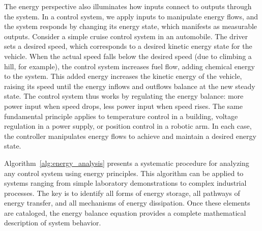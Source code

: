 The energy perspective also illuminates how inputs connect to outputs through the system. In a control system, we apply inputs to manipulate energy flows, and the system responds by changing its energy state, which manifests as measurable outputs. Consider a simple cruise control system in an automobile. The driver sets a desired speed, which corresponds to a desired kinetic energy state for the vehicle. When the actual speed falls below the desired speed (due to climbing a hill, for example), the control system increases fuel flow, adding chemical energy to the system. This added energy increases the kinetic energy of the vehicle, raising its speed until the energy inflows and outflows balance at the new steady state. The control system thus works by regulating the energy balance: more power input when speed drops, less power input when speed rises. The same fundamental principle applies to temperature control in a building, voltage regulation in a power supply, or position control in a robotic arm. In each case, the controller manipulates energy flows to achieve and maintain a desired energy state.

Algorithm~\ref{alg:energy_analysis} presents a systematic procedure for analyzing any control system using energy principles. This algorithm can be applied to systems ranging from simple laboratory demonstrations to complex industrial processes. The key is to identify all forms of energy storage, all pathways of energy transfer, and all mechanisms of energy dissipation. Once these elements are cataloged, the energy balance equation provides a complete mathematical description of system behavior.

